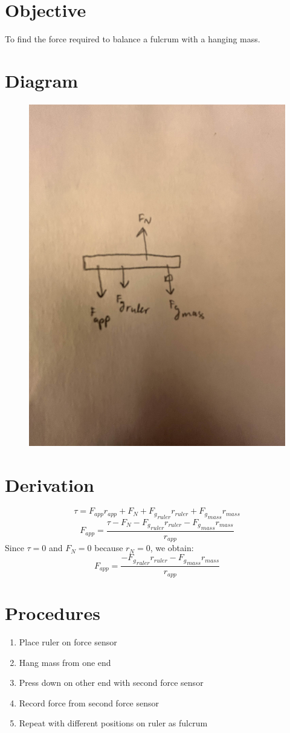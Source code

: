 \documentclass{article}
\begin{document}
\section*{Objective}
To find the force required to balance a fulcrum with a hanging mass.
\section*{Diagram}
\begin{figure}[H]
    \centering
    \includegraphics[height=15cm]{Lab 5.3.2.jpg}
\end{figure}
\section*{Derivation}
\[\tau = F_{app}r_{app} + F_N + {F_g}_{ruler}r_{ruler} + {F_g}_{mass}r_{mass}\]
\[F_{app} = \frac{\tau - F_N - {F_g}_{ruler}r_{ruler} - {F_g}_{mass}r_{mass}}{r_{app}}\]
Since $\tau = 0$ and $F_N = 0$ because $r_N = 0$, we obtain:
\[F_{app} = \frac{-{F_g}_{ruler}r_{ruler} - {F_g}_{mass}r_{mass}}{r_{app}}\]
\section*{Procedures}
\begin{enumerate}
    \item Place ruler on force sensor
    \item Hang mass from one end
    \item Press down on other end with second force sensor
    \item Record force from second force sensor
    \item Repeat with different positions on ruler as fulcrum
\end{enumerate}
\end{document}
